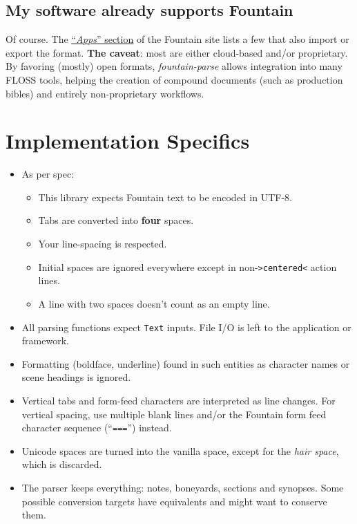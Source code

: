 \documentclass[11pt]{article}
\newcommand{\link}[2]{\underline{\color{darkblue}\href{#1}{#2}}}
\begin{document}
  \subsection*{My software already supports Fountain}
  Of course. The
  \link{https://fountain.io/apps/}{``\emph{Apps}''
  section} of the Fountain site lists a few that also import or
  export the format. \textbf{The caveat}: most are either
  cloud-based and/or proprietary. By favoring (mostly) open
  formats, \emph{fountain-parse} allows integration into many
  \textrm{FLOSS} tools, helping the creation of compound
  documents (such as production bibles) and entirely
  non-proprietary workflows.

\section*{Implementation Specifics}
  \begin{itemize}
    \item As per spec:
      \begin{itemize}
        \item This library expects Fountain text to be
          encoded in \textrm{UTF-8}.
        \item Tabs are converted into \textbf{four} spaces.
        \item Your line-spacing is respected.
        \item Initial spaces are ignored everywhere except in
          non-\texttt{\textgreater{}centered{}\textless} action
          lines.
        \item A line with two spaces doesn't count as
          an empty line.
      \end{itemize}
    \item All parsing functions expect \texttt{Text} inputs.
      File I/O is left to the application or framework.
    \item Formatting (boldface, underline) found in such
      entities as character names or scene headings is
      ignored.
    \item Vertical tabs and form-feed characters are
      interpreted as line changes. For vertical spacing, use
      multiple blank lines and/or the Fountain form feed
      character sequence (``\texttt{===}'') instead.
    \item Unicode spaces are turned into the vanilla space,
      except for the \emph{hair space}, which is discarded.
    \item The parser keeps everything: notes, boneyards,
      sections and synopses. Some possible conversion targets
      have equivalents and might want to conserve them.
  \end{itemize}
\end{document}
